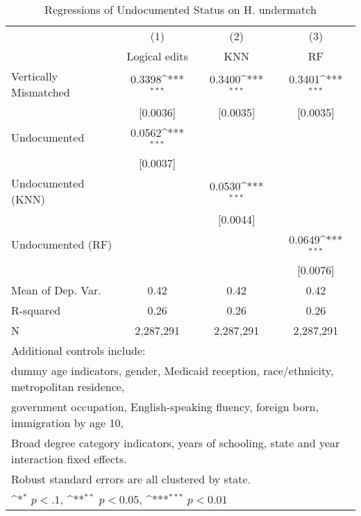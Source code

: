 \begin{table}[htbp]\centering
\def\sym#1{\ifmmode^{#1}\else\(^{#1}\)\fi}
\caption{Regressions of Undocumented Status on H. undermatch}
\begin{tabular}{l*{3}{c}}
\toprule
                    &\multicolumn{1}{c}{(1)}         &\multicolumn{1}{c}{(2)}         &\multicolumn{1}{c}{(3)}         \\
                    &Logical edits         &         KNN         &          RF         \\
\midrule
Vertically Mismatched&      0.3398\sym{***}&      0.3400\sym{***}&      0.3401\sym{***}\\
                    &    [0.0036]         &    [0.0035]         &    [0.0035]         \\
\addlinespace
Undocumented        &      0.0562\sym{***}&                     &                     \\
                    &    [0.0037]         &                     &                     \\
\addlinespace
Undocumented (KNN)  &                     &      0.0530\sym{***}&                     \\
                    &                     &    [0.0044]         &                     \\
\addlinespace
Undocumented (RF)   &                     &                     &      0.0649\sym{***}\\
                    &                     &                     &    [0.0076]         \\
\midrule
Mean of Dep. Var.   &        0.42         &        0.42         &        0.42         \\
R-squared           &        0.26         &        0.26         &        0.26         \\
N                   &   2,287,291         &   2,287,291         &   2,287,291         \\
\bottomrule
\multicolumn{4}{l}{\footnotesize Additional controls include:}\\
\multicolumn{4}{l}{\footnotesize dummy age indicators, gender, Medicaid reception, race/ethnicity, metropolitan residence,}\\
\multicolumn{4}{l}{\footnotesize government occupation, English-speaking fluency, foreign born, immigration by age 10,}\\
\multicolumn{4}{l}{\footnotesize Broad degree category indicators, years of schooling, state and year interaction fixed effects.}\\
\multicolumn{4}{l}{\footnotesize Robust standard errors are all clustered by state.}\\
\multicolumn{4}{l}{\footnotesize \sym{*} \(p<.1\), \sym{**} \(p<0.05\), \sym{***} \(p<0.01\)}\\
\end{tabular}
\end{table}
